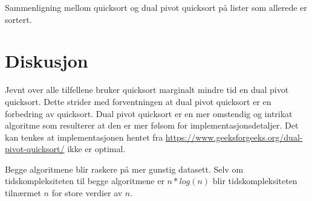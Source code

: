 \documentclass{article}
\begin{document}
\begin{center}
Sammenligning mellom quicksort og dual pivot quicksort på lister som allerede er sortert.
\\
\end{center}

\section{Diskusjon}
Jevnt over alle tilfellene bruker quicksort marginalt mindre tid en dual pivot quicksort. Dette strider med forventningen at dual pivot quicksort er en forbedring av quicksort. Dual pivot quicksort er en mer omstendig og intrikat algoritme som resulterer at den er mer følsom for implementasjonsdetaljer. Det kan tenkes at implementasjonen hentet fra \hyperlink{geksforgeeks.com }{https://www.geeksforgeeks.org/dual-pivot-quicksort/} ikke er optimal.

Begge algoritmene blir raskere på mer gunstig datasett. Selv om tidskompleksiteten til begge algoritmene er \(n * log(n)\) blir tidskompleksiteten tilnærmet \(n\) for store verdier av \(n\).
\end{document}
